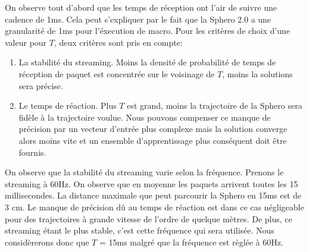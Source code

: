 On observe tout d'abord que les temps de réception ont l'air de suivre une cadence de 1ms.
Cela peut s'expliquer par le fait que la Sphero 2.0 a une granularité de 1ms pour l'éxecution de macro.\cite{product}
Pour les critères de choix d'une valeur pour $T$, deux critères sont pris en compte:
\begin{enumerate}
 \item La stabilité du streaming. Moins la densité de probabilité de temps de réception de paquet est concentrée sur le voisinage de $T$, moins la solutions sera précise.
 \item Le temps de réaction. Plus $T$ est grand, moins la trajectoire de la Sphero sera fidèle à la trajectoire voulue.
 Nous pouvons compenser ce manque de précision par un vecteur d'entrée plus complexe mais la solution converge alors moins vite et un ensemble d'apprentissage plus conséquent doit être fournis.
\end{enumerate}

On observe que la stabilité du streaming varie selon la fréquence.
Prenons le streaming à 60Hz. On observe que en moyenne les paquets arrivent toutes les 15 millisecondes.
La distance maximale que peut parcourir la Sphero en 15ms est de 3 cm.
Le manque de précision dû au temps de réaction est dans ce cas négligeable pour des trajectoires à grande vitesse de l'ordre de quelque mètres.
De plus, ce streaming étant le plus stable, c'est cette fréquence qui sera utilisée.
Nous considèrerons donc que $T$ = 15ms malgré que la fréquence est règlée à 60Hz.
